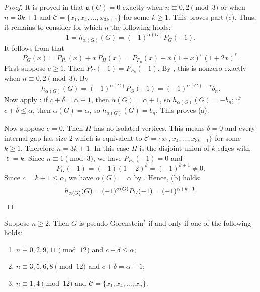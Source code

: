 \documentclass[12pt]{amsart}
\theoremstyle{plain}
\theoremstyle{definition}
\begin{document}
\begin{proof}
It is proved in \cite[Theorems 5.6 and 5.7]{Kara_Vien_2026} that \(\mathfrak a(G)=0\)  exactly when \(n\equiv 0,2\pmod 3\) or when  \(n=3k+1\) and \(\mathcal C=\{x_1,x_4,\dots,x_{3k+1}\}\)
for some \(k\ge 1\).  This proves part (c). Thus, it remains to consider for which $n$ the following holds: 
\[
1= h_{\alpha(G)}(G)=(-1)^{\alpha(G)}P_G(-1).
\]
It follows from  that
\[
P_G(x)=P_{P_n}(x)+x\,P_H(x)
      =P_{P_n}(x)+x(1+x)^e(1+2x)^\ell.
\]
First suppose \(e\ge 1\). Then  \(P_G(-1)=P_{P_n}(-1)\). By , this is nonzero exactly when
\(n\equiv 0,2\pmod 3\). By  
\[
h_{\alpha(G)}(G)=(-1)^{\alpha(G)}P_G(-1)
= (-1)^{\alpha(G)-\alpha}b_n.
\]
Now apply : if \(c+\delta=\alpha+1\), then
\(\alpha(G)=\alpha+1\), so \(h_{\alpha(G)}(G)=-b_n\); if \(c+\delta\le \alpha\),
then \(\alpha(G)=\alpha\), so \(h_{\alpha(G)}(G)=b_n\). This proves (a).

Now suppose \(e=0\). Then \(H\) has no isolated vertices. This means \(\delta=0\) and
every internal gap has size \(2\) which is equivalent to \(\mathcal C=\{x_1,x_4,\dots,x_{3k+1}\}\)
for some \(k\ge 1\). Therefore \(n=3k+1\). In this case \(H\) is the
disjoint union of \(k\) edges with \(\ell=k\). Since \(n\equiv 1\pmod 3\), we have
\(P_{P_n}(-1)=0\) and 
\[
P_G(-1)=(-1)(1-2)^k=(-1)^{k+1}\neq 0.
\]
Since  \(c=k+1\le \alpha\), we have
\(\alpha(G)=\alpha\) by . Hence, (b) holds:
\[
h_{\alpha(G)}(G)=(-1)^{\alpha(G)}P_G(-1)=(-1)^{\alpha+k+1}. \qedhere
\]
\end{proof}

\begin{cor}\label{cor:suspension_path}
Suppose \(n\ge 2\). Then \(G\) is pseudo-Gorenstein\(^{*}\) if and only if one of
the following holds:
\begin{enumerate}[label=(\alph*)]
\item \(n\equiv 0,2,9,11 \pmod{12}\) and \(c+\delta\le \alpha\);

\item \(n\equiv 3,5,6,8 \pmod{12}\) and \(c+\delta=\alpha+1\);

\item \(n\equiv 1,4 \pmod{12}\) and \(\mathcal C=\{x_1,x_4,\dots,x_n\}\).
\end{enumerate}
\end{cor}
\end{document}

